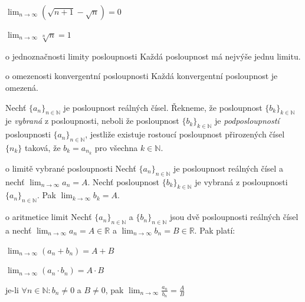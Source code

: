 \begin{priklady}
\begin{pitemize}
	\item $\lim_{n \rightarrow \infty} (\sqrt{n+1} - \sqrt{n}) = 0$
	\item $\lim_{n \rightarrow \infty} \sqrt[n]{n} = 1$
\end{pitemize}
\end{priklady}

\begin{vetaN}{o jednoznačnosti limity posloupnosti}
Každá posloupnost má nejvýše jednu limitu.
\end{vetaN}

\begin{vetaN}{o omezenosti konvergentní posloupnosti}
Každá konvergentní posloupnost je omezená.
\end{vetaN}

\begin{definice}
Nechť $\{a_n\}_{n \in \mathbb{N}}$ je posloupnost reálných čísel. Řekneme, že posloupnost $\{b_k\}_{k \in \mathbb{N}}$ je \emph{vybraná} z posloupnosti, neboli že posloupnost $\{b_k\}_{k \in \mathbb{N}}$ je \emph{podposloupností} posloupnosti $\{a_n\}_{n \in \mathbb{N}}$, jestliže existuje rostoucí posloupnost přirozených čísel $\{n_k\}$ taková, že $b_k = a_{n_k}$ pro všechna $k \in \mathbb{N}$.
\end{definice}

\begin{vetaN}{o limitě vybrané posloupnosti}
Nechť $\{a_n\}_{n \in \mathbb{N}}$ je posloupnost reálných čísel a nechť $\lim_{n \rightarrow \infty} a_n = A$. Nechť posloupnost $\{b_k\}_{k \in \mathbb{N}}$ je vybraná z posloupnosti $\{a_n\}_{n \in \mathbb{N}}$. Pak $\lim_{k \rightarrow \infty} b_k = A$.
\end{vetaN}

\begin{vetaN}{o aritmetice limit}
Nechť $\{a_n\}_{n \in \mathbb{N}}$ a $\{b_n\}_{n \in \mathbb{N}}$ jsou dvě posloupnosti reálných čísel a nechť $\lim_{n \rightarrow \infty} a_n = A \in \mathbb{R}$ a $\lim_{n \rightarrow \infty} b_n = B \in \mathbb{R}$. Pak platí:
\begin{penumerate}
	\item $\lim_{n \rightarrow \infty} (a_n+b_n) = A+B$
	\item $\lim_{n \rightarrow \infty} (a_n \cdot  b_n) = A\cdot B$
	\item je-li $\forall n \in \mathbb{N}: b_n \neq 0$ a $B \neq 0$, pak $\lim_{n \rightarrow \infty} \frac{a_n}{b_n}=\frac{A}{B}$
\end{penumerate}
\end{vetaN}

